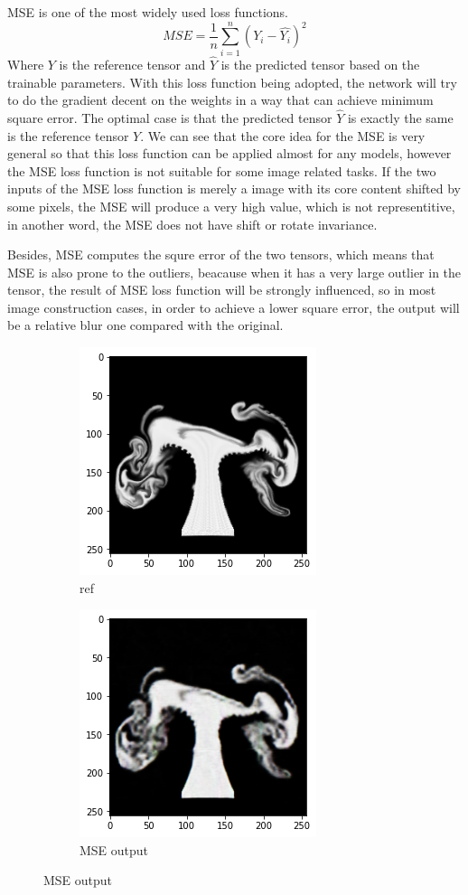 \documentclass[a4paper,12pt,twoside]{report}
\begin{document}
MSE is one of the most widely used loss functions.
\begin{equation}
{MSE}=\frac{1}{n}\sum_{i=1}^n(Y_i-\hat{Y_i})^2
\end{equation}
Where ${Y}$ is the reference tensor and $\hat{Y}$ is the predicted tensor based on the trainable parameters. With this loss function being adopted, the network will try to do the gradient decent on the weights in a way that can achieve minimum square error. The optimal case is that the predicted tensor $\hat{Y}$ is exactly the same is the reference tensor ${Y}$. We can see that the core idea for the MSE is very general so that this loss function can be applied almost for any models, however the MSE loss function is not suitable for some image related tasks. If the two inputs of the MSE loss function is merely a image with its core content shifted by some pixels, the MSE will produce a very high value, which is not representitive, in another word, the MSE does not have shift or rotate invariance. 

Besides, MSE computes the squre error of the two tensors, which means that MSE is also prone to the outliers, beacause when it has a very large outlier in the tensor, the result of MSE loss function will be strongly influenced, so in most image construction cases, in order to achieve a lower square error, the output will be a relative blur one compared with the original.
\begin{figure}
\centering
\begin{subfigure}{0.4\textwidth}
  \centering
  \includegraphics[scale=0.5]{MSEref.png}
  \caption{ref}
\end{subfigure}
\begin{subfigure}{0.4\textwidth}
  \centering
  \includegraphics[scale=0.5]{MSEblur.png}
  \caption{MSE output}
\end{subfigure}
\end{figure}
\end{document}
